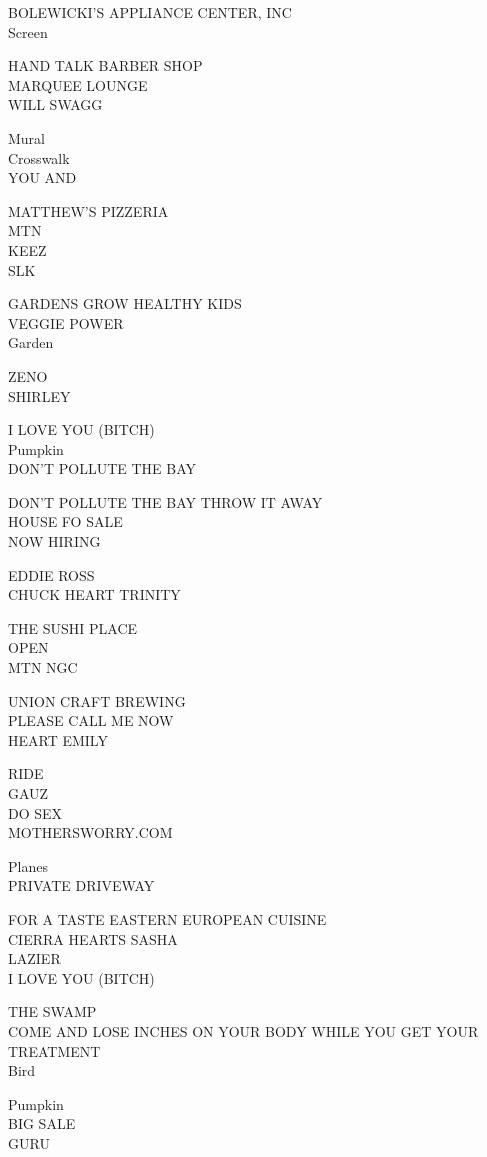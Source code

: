 \documentclass[10pt,letterpaper]{article}
\begin{document}
BOLEWICKI'S APPLIANCE CENTER, INC\\
Screen

HAND TALK BARBER SHOP\\
MARQUEE LOUNGE\\
WILL SWAGG

Mural\\
Crosswalk\\
YOU AND

MATTHEW'S PIZZERIA\\
MTN\\
KEEZ\\
SLK

GARDENS GROW HEALTHY KIDS\\
VEGGIE POWER\\
Garden

ZENO\\
SHIRLEY

I LOVE YOU (BITCH)\\
Pumpkin\\
DON'T POLLUTE THE BAY

DON'T POLLUTE THE BAY THROW IT AWAY\\
HOUSE FO SALE\\
NOW HIRING

EDDIE ROSS\\
CHUCK HEART TRINITY

THE SUSHI PLACE\\
OPEN\\
MTN NGC

UNION CRAFT BREWING\\
PLEASE CALL ME NOW\\
HEART EMILY

RIDE\\
GAUZ\\
DO SEX\\
MOTHERSWORRY.COM

Planes\\
PRIVATE DRIVEWAY

FOR A TASTE EASTERN EUROPEAN CUISINE\\
CIERRA HEARTS SASHA\\
LAZIER\\
I LOVE YOU (BITCH)

THE SWAMP\\
COME AND LOSE INCHES ON YOUR BODY WHILE YOU GET YOUR TREATMENT\\
Bird

Pumpkin\\
BIG SALE\\
GURU
\end{document}
